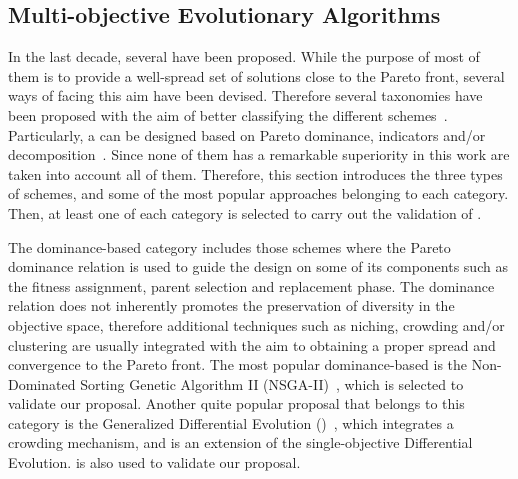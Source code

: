 \subsection{Multi-objective Evolutionary Algorithms}

In the last decade, several \MOEAS{} have been proposed. 
%
While the purpose of most of them is to provide a well-spread set of solutions close to the Pareto front,
several ways of facing this aim have been devised.
%
Therefore several taxonomies have been proposed with the aim of better classifying the different schemes~\cite{Joel:BOOK_MOEAs}.
%
Particularly, a \MOEA{} can be designed based on Pareto dominance, indicators and/or decomposition~\cite{Joel:StateArt}.
%
%
Since none of them has a remarkable superiority in this work are taken into account all of them.
%
Therefore, this section introduces the three types of schemes, and some of the most popular approaches belonging to each category.
%
Then, at least one \MOEA{} of each category is selected to carry out the validation of \VSDMOEA{}.

The dominance-based category includes those schemes where the Pareto dominance relation is used to guide the design on some of its components such as the
fitness assignment, parent selection and replacement phase.
%
The dominance relation does not inherently promotes the preservation of diversity in the objective space, therefore additional techniques such as niching, crowding and/or clustering 
are usually integrated with the aim to obtaining a proper spread and convergence to the Pareto front.
%
The most popular dominance-based \MOEA{} is the Non-Dominated Sorting Genetic Algorithm II (NSGA-II)~\cite{Joel:NSGAII}, which is selected to validate our proposal.
%
Another quite popular proposal that belongs to this category is the Generalized Differential Evolution (\GDEIII{})~\cite{Joel:GDE3}, which integrates a crowding mechanism, and is an extension of the single-objective
Differential Evolution.
%
\GDEIII{} is also used to validate our proposal.

